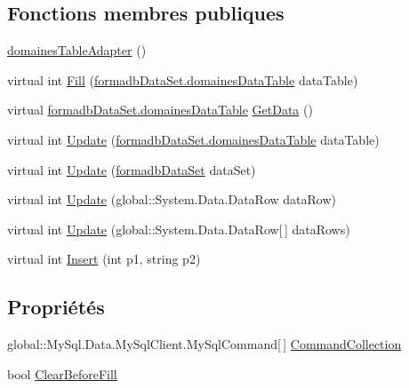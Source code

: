 \subsection*{Fonctions membres publiques}
\begin{DoxyCompactItemize}
\item 
\hyperlink{classforma_1_1formadb_data_set_table_adapters_1_1domaines_table_adapter_a0d7d0aaf67eaba93e473b71d5a1210fb}{domaines\+Table\+Adapter} ()
\item 
virtual int \hyperlink{classforma_1_1formadb_data_set_table_adapters_1_1domaines_table_adapter_a0cfb2736d250beb29006a5bd180e9bce}{Fill} (\hyperlink{classforma_1_1formadb_data_set_1_1domaines_data_table}{formadb\+Data\+Set.\+domaines\+Data\+Table} data\+Table)
\item 
virtual \hyperlink{classforma_1_1formadb_data_set_1_1domaines_data_table}{formadb\+Data\+Set.\+domaines\+Data\+Table} \hyperlink{classforma_1_1formadb_data_set_table_adapters_1_1domaines_table_adapter_aef91b31efc4470165e2782db31a26c60}{Get\+Data} ()
\item 
virtual int \hyperlink{classforma_1_1formadb_data_set_table_adapters_1_1domaines_table_adapter_a84cd892385e90a961ed1f459b61d131b}{Update} (\hyperlink{classforma_1_1formadb_data_set_1_1domaines_data_table}{formadb\+Data\+Set.\+domaines\+Data\+Table} data\+Table)
\item 
virtual int \hyperlink{classforma_1_1formadb_data_set_table_adapters_1_1domaines_table_adapter_aee5313ae042bde6ece00d386c34f03c7}{Update} (\hyperlink{classforma_1_1formadb_data_set}{formadb\+Data\+Set} data\+Set)
\item 
virtual int \hyperlink{classforma_1_1formadb_data_set_table_adapters_1_1domaines_table_adapter_ab017e9417ef2d3886614fa6a239e91ec}{Update} (global\+::\+System.\+Data.\+Data\+Row data\+Row)
\item 
virtual int \hyperlink{classforma_1_1formadb_data_set_table_adapters_1_1domaines_table_adapter_a0291ae1a8b9be25822840c973f989817}{Update} (global\+::\+System.\+Data.\+Data\+Row\mbox{[}$\,$\mbox{]} data\+Rows)
\item 
virtual int \hyperlink{classforma_1_1formadb_data_set_table_adapters_1_1domaines_table_adapter_a1e7f11fec2610c54fae3ed53f22c8d10}{Insert} (int p1, string p2)
\end{DoxyCompactItemize}
\subsection*{Propriétés}
\begin{DoxyCompactItemize}
\item 
global\+::\+My\+Sql.\+Data.\+My\+Sql\+Client.\+My\+Sql\+Command\mbox{[}$\,$\mbox{]} \hyperlink{classforma_1_1formadb_data_set_table_adapters_1_1domaines_table_adapter_afec7c0caa6550f23bbd36e190a0e23ab}{Command\+Collection}
\item 
bool \hyperlink{classforma_1_1formadb_data_set_table_adapters_1_1domaines_table_adapter_a0403692e10bf992e26bf6d45badd8a73}{Clear\+Before\+Fill}
\end{DoxyCompactItemize}


